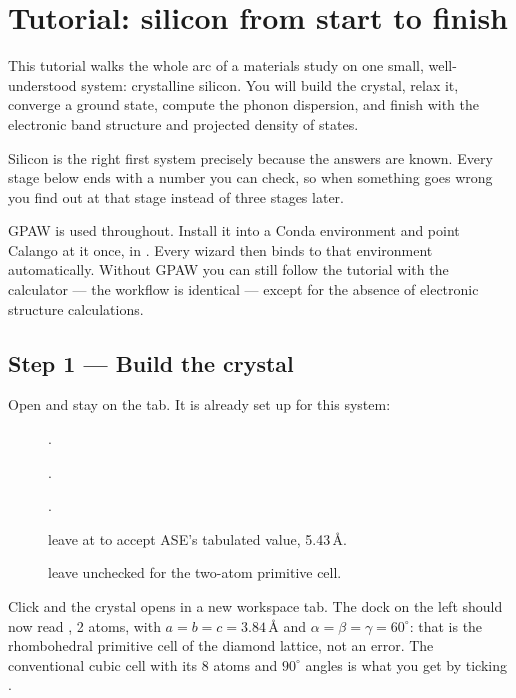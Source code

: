 \chapter{Tutorial: silicon from start to finish}
\label{ch:tutorial-silicon}

This tutorial walks the whole arc of a materials study on one small,
well-understood system: crystalline silicon. You will build the crystal,
relax it, converge a ground state, compute the phonon dispersion, and finish
with the electronic band structure and projected density of states.

Silicon is the right first system precisely because the answers are known.
Every stage below ends with a number you can check, so when something goes
wrong you find out at that stage instead of three stages later.

\begin{calwarn}
GPAW is used throughout. Install it into a Conda environment and point
Calango at it once, in \menusep{}\menusep{}. Every wizard then binds to that environment automatically.
Without GPAW you can still follow the tutorial with the  calculator ---
the workflow is identical --- except for the absence of electronic structure calculations.
\end{calwarn}

\section{Step 1 --- Build the crystal}

Open \menusep{} and stay on the 
tab. It is already set up for this system:

\begin{description}
  \item[] .
  \item[] .
  \item[] .
  \item[] leave at  to accept ASE's tabulated
    value, 5.43\,\AA.
  \item[] leave unchecked for the two-atom primitive cell.
\end{description}

Click  and the crystal opens in a new workspace tab. The
 dock on the left should now read , 2 atoms, with
$a = b = c = 3.84$\,\AA{} and $\alpha = \beta = \gamma = 60^\circ$: that is
the rhombohedral primitive cell of the diamond lattice, not an error. The
conventional cubic cell with its 8 atoms and $90^\circ$ angles is what you get
by ticking .

